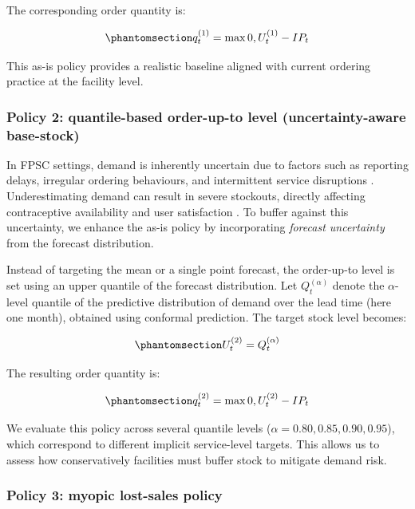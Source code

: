 \documentclass[
  authoryear,
  doubleblind,
  3p]{elsarticle}
\begin{document}
The corresponding order quantity is:

\begin{equation}\phantomsection\label{eq-order}{
q_t^{(1)} = \max{0, U_t^{(1)} - IP_t}
}\end{equation}

This as-is policy provides a realistic baseline aligned with current
ordering practice at the facility level.

\subsubsection{Policy 2: quantile-based order-up-to level
(uncertainty-aware
base-stock)}\label{policy-2-quantile-based-order-up-to-level-uncertainty-aware-base-stock}

In FPSC settings, demand is inherently uncertain due to factors such as
reporting delays, irregular ordering behaviours, and intermittent
service disruptions \citep{hewage2025}. Underestimating demand can
result in severe stockouts, directly affecting contraceptive
availability and user satisfaction \citep{karimi2021}. To buffer against
this uncertainty, we enhance the as-is policy by incorporating
\emph{forecast uncertainty} from the forecast distribution.

Instead of targeting the mean or a single point forecast, the
order-up-to level is set using an upper quantile of the forecast
distribution. Let \(Q^{(\alpha)}_t\) denote the \(\alpha\)-level
quantile of the predictive distribution of demand over the lead time
(here one month), obtained using conformal prediction. The target stock
level becomes:

\begin{equation}\phantomsection\label{eq-quantile}{
U_t^{(2)} = Q^{(\alpha)}_t
}\end{equation}

The resulting order quantity is:

\begin{equation}\phantomsection\label{eq-order_qnt}{
q_t^{(2)} = \max{0, U_t^{(2)} - IP_t}
}\end{equation}

We evaluate this policy across several quantile levels
(\(\alpha = 0.80, 0.85, 0.90, 0.95\)), which correspond to different
implicit service-level targets. This allows us to assess how
conservatively facilities must buffer stock to mitigate demand risk.

\subsubsection{Policy 3: myopic lost-sales
policy}\label{policy-3-myopic-lost-sales-policy}
\end{document}
